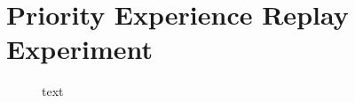 \section{Priority Experience Replay Experiment}

\begin{figure}[h]
	\centering
	
	\caption{text}
\end{figure}


